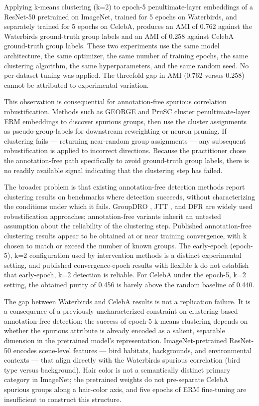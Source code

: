 
Applying k-means clustering (k=2) to epoch-5 penultimate-layer embeddings of a ResNet-50 pretrained on ImageNet, trained for 5 epochs on Waterbirds, and separately trained for 5 epochs on CelebA, produces an AMI of 0.762 against the Waterbirds ground-truth group labels and an AMI of 0.258 against CelebA ground-truth group labels. These two experiments use the same model architecture, the same optimizer, the same number of training epochs, the same clustering algorithm, the same hyperparameters, and the same random seed. No per-dataset tuning was applied. The threefold gap in AMI (0.762 versus 0.258) cannot be attributed to experimental variation.

This observation is consequential for annotation-free spurious correlation robustification. Methods such as GEORGE \citep{Sohonietal2020} and PruSC \citep{Kimetal2024} cluster penultimate-layer ERM embeddings to discover spurious groups, then use the cluster assignments as pseudo-group-labels for downstream reweighting or neuron pruning. If clustering fails — returning near-random group assignments — any subsequent robustification is applied to incorrect directions. Because the practitioner chose the annotation-free path specifically to avoid ground-truth group labels, there is no readily available signal indicating that the clustering step has failed.

The broader problem is that existing annotation-free detection methods report clustering results on benchmarks where detection succeeds, without characterizing the conditions under which it fails. GroupDRO \citep{Sagawaetal2020}, JTT \citep{Liuetal2021}, and DFR \citep{Izmailovetal2022} are widely used robustification approaches; annotation-free variants inherit an untested assumption about the reliability of the clustering step. Published annotation-free clustering results appear to be obtained at or near training convergence, with k chosen to match or exceed the number of known groups. The early-epoch (epoch-5), k=2 configuration used by intervention methods is a distinct experimental setting, and published convergence-epoch results with flexible k do not establish that early-epoch, k=2 detection is reliable. For CelebA under the epoch-5, k=2 setting, the obtained purity of 0.456 is barely above the random baseline of 0.440.

The gap between Waterbirds and CelebA results is not a replication failure. It is a consequence of a previously uncharacterized constraint on clustering-based annotation-free detection: the success of epoch-5 k-means clustering depends on whether the spurious attribute is already encoded as a salient, separable dimension in the pretrained model's representation. ImageNet-pretrained ResNet-50 encodes scene-level features — bird habitats, backgrounds, and environmental contexts — that align directly with the Waterbirds spurious correlation (bird type versus background). Hair color is not a semantically distinct primary category in ImageNet; the pretrained weights do not pre-separate CelebA spurious groups along a hair-color axis, and five epochs of ERM fine-tuning are insufficient to construct this structure.

